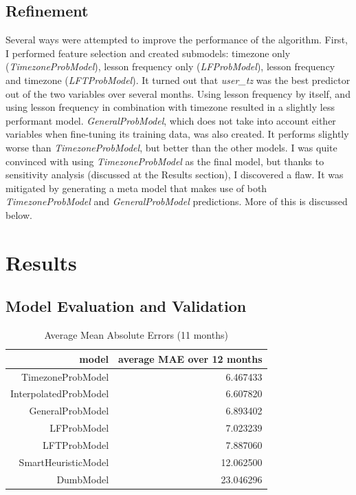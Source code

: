 \documentclass[oneside]{article}
\begin{document}
\subsection{Refinement}

Several ways were attempted to improve the performance of the algorithm.
First, I performed feature selection and created submodels: timezone only
(\emph{TimezoneProbModel}), lesson frequency only (\emph{LFProbModel}), lesson
frequency and timezone (\emph{LFTProbModel}). It turned out that
\emph{user\_tz} was the best predictor out of the two variables over several
months. Using lesson frequency by itself, and using lesson frequency in
combination with timezone resulted in a slightly less performant model.
\emph{GeneralProbModel}, which does not take into account either variables when
fine-tuning its training data, was also created. It performs slightly worse
than \emph{TimezoneProbModel}, but better than the other models. I was quite
convinced with using \emph{TimezoneProbModel} as the final model, but thanks to
sensitivity analysis (discussed at the Results section), I discovered a flaw.
It was mitigated by generating a meta model that makes use of both
\emph{TimezoneProbModel} and \emph{GeneralProbModel} predictions. More of this
is discussed below.

\section{Results}

\subsection {Model Evaluation and Validation}

\begin{table}[]
  \centering
  \caption{Average Mean Absolute Errors (11 months)}
  \label{tab:avg_mae_of_models}
  \begin{tabular}{rr}
    \textbf{model} & \textbf{average MAE over 12 months} \\
    \hline
    TimezoneProbModel &            6.467433 \\
    InterpolatedProbModel &        6.607820 \\
    GeneralProbModel &             6.893402 \\
    LFProbModel &                  7.023239 \\
    LFTProbModel &                 7.887060 \\
    SmartHeuristicModel &         12.062500 \\
    DumbModel &                   23.046296 \\
    \hline
  \end{tabular}
\end{table}
\end{document}
